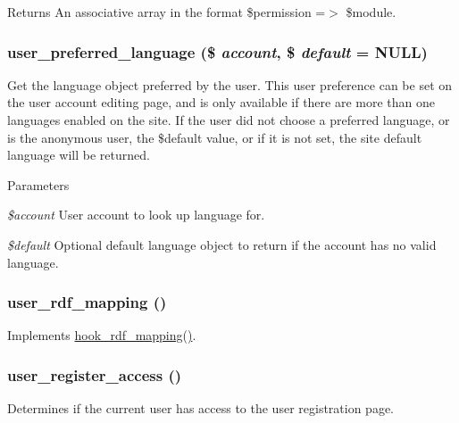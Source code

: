 \begin{DoxyReturn}{Returns}
An associative array in the format \$permission =$>$ \$module. 
\end{DoxyReturn}
\hypertarget{user_8module_a0122ed84b87c9b23dbd3be7ff563bc49}{
\subsubsection[{user\_\-preferred\_\-language}]{\setlength{\rightskip}{0pt plus 5cm}user\_\-preferred\_\-language (\$ {\em account}, \/  \$ {\em default} = {\ttfamily NULL})}}
\label{user_8module_a0122ed84b87c9b23dbd3be7ff563bc49}
Get the language object preferred by the user. This user preference can be set on the user account editing page, and is only available if there are more than one languages enabled on the site. If the user did not choose a preferred language, or is the anonymous user, the \$default value, or if it is not set, the site default language will be returned.


\begin{DoxyParams}{Parameters}
\item[{\em \$account}]User account to look up language for. \item[{\em \$default}]Optional default language object to return if the account has no valid language. \end{DoxyParams}
\hypertarget{user_8module_a8c78debb117144a12195c59dc76d7f01}{
\subsubsection[{user\_\-rdf\_\-mapping}]{\setlength{\rightskip}{0pt plus 5cm}user\_\-rdf\_\-mapping ()}}
\label{user_8module_a8c78debb117144a12195c59dc76d7f01}
Implements \hyperlink{group__rdf_gae3e7f047bdcb9309b323e2af09966765}{hook\_\-rdf\_\-mapping()}. \hypertarget{user_8module_aeefc598398af2604fed325d4cb9f2577}{
\subsubsection[{user\_\-register\_\-access}]{\setlength{\rightskip}{0pt plus 5cm}user\_\-register\_\-access ()}}
\label{user_8module_aeefc598398af2604fed325d4cb9f2577}
Determines if the current user has access to the user registration page.

